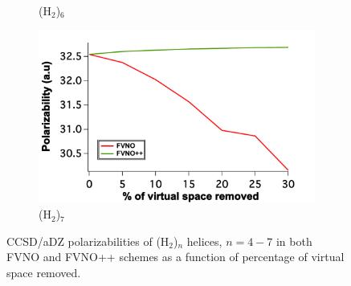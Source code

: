\begin{figure}
\begin{subfigure}{.5\textwidth}
  \caption{(H$_2$)$_6$}
  \label{fig:sfig2}
\end{subfigure}
\begin{subfigure}{.5\textwidth}
  \centering
  \includegraphics[width=.9\linewidth]{figures_fvno++/fvno++_h2_7_adz_polar.pdf}
  \caption{(H$_2$)$_7$}
  \label{fig:sfig2}
\end{subfigure}
\caption{{\footnotesize CCSD/aDZ polarizabilities of
(H$_2$)$_n$ helices, $ n = 4-7$ in both FVNO and FVNO++ schemes as a function of
percentage of virtual space removed.}}
\label{fig:fvno++_polar_h2_n}
\end{figure}
